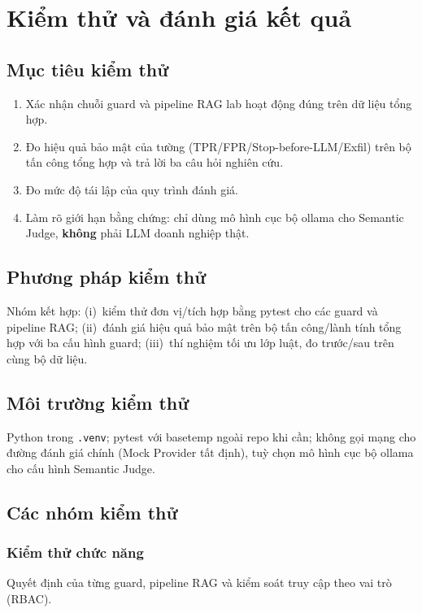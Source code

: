 \chapter{Kiểm thử và đánh giá kết quả}
\label{ch:kiem-thu}

\section{Mục tiêu kiểm thử}

\begin{enumerate}
    \item Xác nhận chuỗi guard và pipeline RAG lab hoạt động đúng trên dữ liệu tổng hợp.
    \item Đo hiệu quả bảo mật của tường (TPR/FPR/Stop-before-LLM/Exfil) trên bộ tấn công tổng hợp và trả lời ba câu hỏi nghiên cứu.
    \item Đo mức độ tái lập của quy trình đánh giá.
    \item Làm rõ giới hạn bằng chứng: chỉ dùng mô hình cục bộ ollama cho Semantic Judge, \textbf{không} phải LLM doanh nghiệp thật.
\end{enumerate}

\section{Phương pháp kiểm thử}

Nhóm kết hợp: (i)~kiểm thử đơn vị/tích hợp bằng pytest cho các guard và pipeline RAG; (ii)~đánh giá hiệu quả bảo mật trên bộ tấn công/lành tính tổng hợp với ba cấu hình guard; (iii)~thí nghiệm tối ưu lớp luật, đo trước/sau trên cùng bộ dữ liệu.

\section{Môi trường kiểm thử}

Python trong \texttt{.venv}; pytest với basetemp ngoài repo khi cần; không gọi mạng cho đường đánh giá chính (Mock Provider tất định), tuỳ chọn mô hình cục bộ ollama cho cấu hình Semantic Judge.

\section{Các nhóm kiểm thử}

\subsection{Kiểm thử chức năng}
Quyết định của từng guard, pipeline RAG và kiểm soát truy cập theo vai trò (RBAC).

